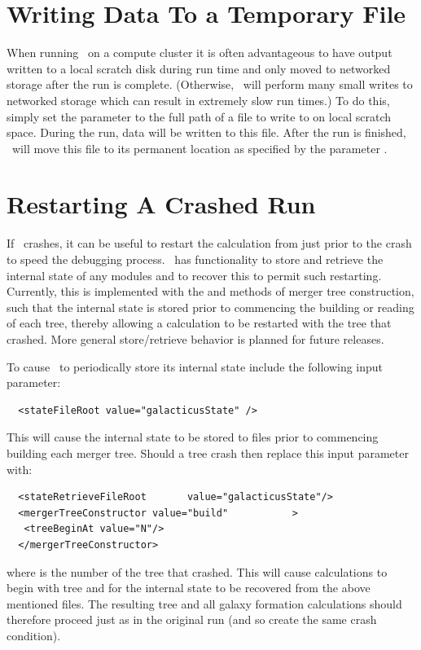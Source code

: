 \section{Writing Data To a Temporary File}

When running \glc\ on a compute cluster it is often advantageous to have output written to a local scratch disk during run time and only moved to networked storage after the run is complete. (Otherwise, \glc\ will perform many small writes to networked storage which can result in extremely slow run times.) To do this, simply set the parameter \mono{[galacticusOutputScratchFileName]} to the full path of a file to write to on local scratch space. During the run, data will be written to this file. After the run is finished, \glc\ will move this file to its permanent location as specified by the parameter \mono{[galacticusOutputFileName]}.

\section{Restarting A Crashed Run}\label{sec:Restarting}

If \glc\ crashes, it can be useful to restart the calculation from just prior to the crash to speed the debugging process. \glc\ has functionality to store and retrieve the internal state of any modules and to recover this to permit such restarting. Currently, this is implemented with the  and  methods of merger tree construction, such that the internal state is stored prior to commencing the building or reading of each tree, thereby allowing a calculation to be restarted with the tree that crashed. More general store/retrieve behavior is planned for future releases.

To cause \glc\ to periodically store its internal state include the following input parameter:
\begin{verbatim}
  <stateFileRoot value="galacticusState" />
\end{verbatim}
This will cause the internal state to be stored to files  prior to commencing building each merger tree. Should a tree crash then replace this input parameter with:
\begin{verbatim}
  <stateRetrieveFileRoot       value="galacticusState"/>
  <mergerTreeConstructor value="build"           >
   <treeBeginAt value="N"/>
  </mergerTreeConstructor>
\end{verbatim}
where  is the number of the tree that crashed. This will cause calculations to begin with tree  and for the internal state to be recovered from the above mentioned files. The resulting tree and all galaxy formation calculations should therefore proceed just as in the original run (and so create the same crash condition).

